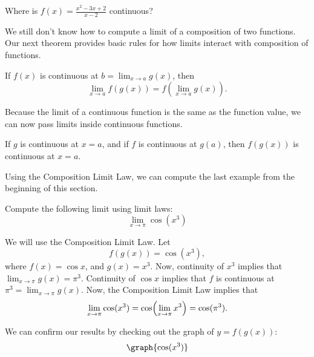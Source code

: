 \documentclass{ximera}
\begin{document}
\begin{question}
  Where is $f(x) = \frac{x^2-3x+2}{x-2}$ continuous?
  \begin{multipleChoice}
  \end{multipleChoice}
\end{question}

We still don't know how to compute  a limit of a composition of two functions.
Our next theorem provides basic rules for how limits interact with composition
of functions.

\begin{theorem}
  If $f(x)$ is continuous at $b = \lim_{x\to a} g(x)$, then
  \[
  \lim_{x\to a} f(g(x)) = f(\lim_{x\to a} g(x)).
  \]
\end{theorem}

Because the limit of a continuous function is the same as the function
value, we can now pass limits inside continuous functions.

\begin{corollary}

If $g$ is continuous at $x=a$, and if $f $ is continuous at $g(a)$,  then $f(g(x))$ is continuous at $x=a$.



\end{corollary}
Using the Composition Limit Law, we can compute the last example from the beginning of this section.
\begin{example}
  Compute the following limit using limit laws:
  \[
  \lim_{x \to \pi}\cos({x^3})
  \]
  \begin{explanation}
  We will use the Composition Limit Law. 
Let
 \[ 
 f(g(x))=\cos({x^3}),
 \]
 where $f(x)=\cos{x}$, and $g(x)=x^3$.
  Now, continuity of $x^3$ implies that $\lim_{x \to \pi}g(x)=\pi^3$.
    Continuity of $\cos{x}$ implies that $f$ is continuous at $\pi^3=\lim_{x \to \pi}g(x)$.
     Now, the Composition Limit Law implies that
    \[
    \lim_{x \to \pi}\cos({x^3})= \cos\Bigl({\lim_{x \to \pi} x^3}\Bigr)=\cos({\pi^3}).
    \]
   
  \begin{onlineOnly}
    We can confirm our results by checking out the graph of $y=f(g(x))$:
    \[
    \graph{\cos({x^3})}
    \]
  \end{onlineOnly}
  \end{explanation}
\end{example}
\end{document}
